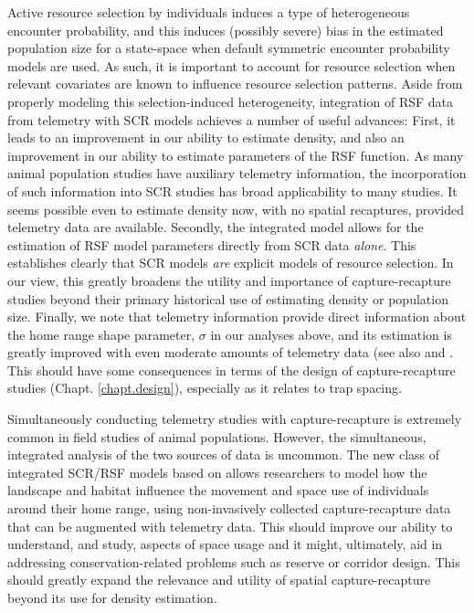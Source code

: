 Active resource selection by individuals induces a type of
heterogeneous encounter probability, and this induces (possibly
severe) bias in the estimated population size for a state-space when
default symmetric encounter probability models are used.  As such, it
is important to account for resource selection
when relevant covariates are
known to influence resource selection patterns.  Aside from properly modeling
this selection-induced heterogeneity, integration of RSF data from
telemetry with SCR models achieves a number of useful advances: First,
it leads to an improvement in our ability to estimate density, and
also an improvement in our ability to estimate parameters of the RSF
function.  As many animal population studies have auxiliary telemetry
information, the incorporation of such information into SCR studies
has broad applicability to many studies.  It seems possible even to
estimate density now, with no spatial recaptures, provided telemetry
data are available.  Secondly, the integrated model allows for the
estimation of RSF model parameters directly from SCR data {\it alone}.
This establishes clearly that SCR models {\it are} explicit models of
resource selection. In our view, this greatly broadens the utility and
importance of capture-recapture studies beyond their primary
historical use of estimating density or population size. Finally, we
note that telemetry information provide direct information about the
home range shape parameter, $\sigma$ in our analyses above, and its
estimation is greatly improved with even moderate amounts of telemetry
data (see also \citet{sollmann_etal:2012ecol} and
\citet{sollmann_etal:inprepjapplecol}.  This should have some
consequences in terms of the design of capture-recapture studies
(Chapt. \ref{chapt.design}), especially as it relates to trap spacing.

Simultaneously conducting telemetry studies with capture-recapture is
extremely common in field studies of animal populations. However, the
simultaneous, integrated analysis of the two sources of data is uncommon.
 The new class of integrated SCR/RSF models based on
\citet{royle_etal:2012mee} allows researchers to model how the
landscape and habitat influence the movement and space use of
individuals around their home range, using non-invasively collected
capture-recapture data that can be augmented with telemetry data.
This should improve our ability to understand, and study, aspects of
space usage and it might, ultimately, aid in addressing
conservation-related problems such as reserve or corridor design. This
 should greatly expand the relevance and utility of spatial
capture-recapture beyond its use for density estimation.






























